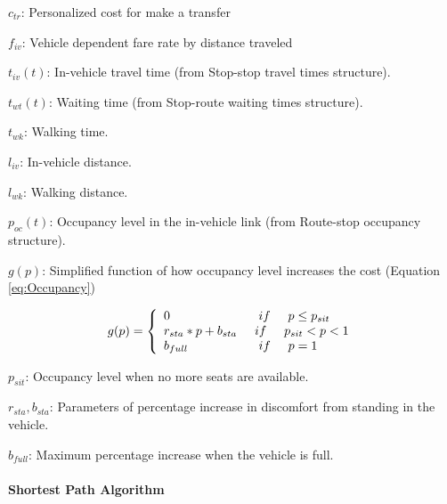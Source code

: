 $c_{tr}$: Personalized cost for make a transfer

$f_{iv}$: Vehicle dependent fare rate by distance traveled

$t_{iv}(t)$: In-vehicle travel time (from Stop-stop travel times structure).

$t_{wt}(t)$: Waiting time (from Stop-route waiting times structure).

$t_{wk}$: Walking time.

$l_{iv}$: In-vehicle distance.

$l_{wk}$: Walking distance.

$p_{oc}(t)$: Occupancy level in the in-vehicle link (from Route-stop occupancy structure).

$g(p)$: Simplified function of how occupancy level increases the cost (Equation \ref{eq:Occupancy})

\begin{equation}\label{eq:Occupancy}
	g(p)=\left\{\begin{array}{l}
	0\hspace{25 mm}if\hspace{5 mm}p \leq p_{sit} \\
	r_{sta}*p + b_{sta}\hspace{5 mm} if\hspace{5 mm}p_{sit}<p<1\\
	b_{full}\hspace{20 mm} if\hspace{5 mm}p=1
	\end{array}\right.
\end{equation}

$p_{sit}$: Occupancy level when no more seats are available.

$r_{sta}, b_{sta}$: Parameters of percentage increase in discomfort from standing in the vehicle.

$b_{full}$: Maximum percentage increase when the vehicle is full.

\paragraph{Shortest Path Algorithm}

